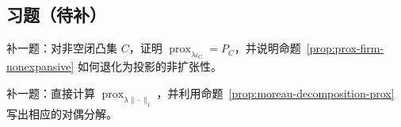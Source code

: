 \subsection*{习题（待补）}

\begin{exercise}
补一题：对非空闭凸集 $C$，证明 $\operatorname{prox}_{\lambda\iota_C}=P_C$，并说明命题~\ref{prop:prox-firm-nonexpansive} 如何退化为投影的非扩张性。
\end{exercise}

\begin{exercise}[软阈值桥接题占位]
补一题：直接计算 $\operatorname{prox}_{\lambda\|\cdot\|_1}$，并利用命题~\ref{prop:moreau-decomposition-prox} 写出相应的对偶分解。
\end{exercise}
